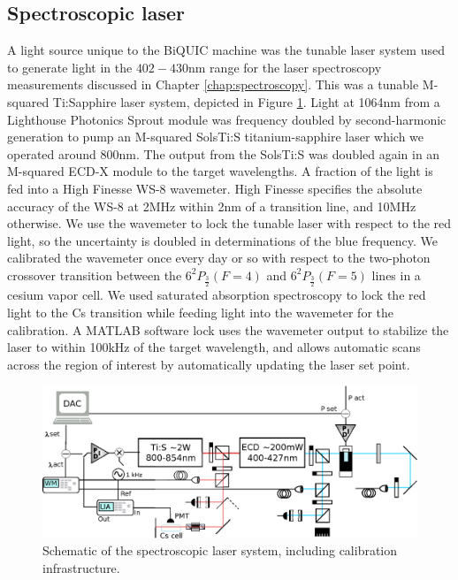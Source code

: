 \subsection*{Spectroscopic laser}
	A light source unique to the BiQUIC machine was the tunable laser system used to generate light in the $402-430$nm range for the laser spectroscopy measurements discussed  in Chapter \ref{chap:spectroscopy}. This  was a tunable M-squared Ti:Sapphire laser system, depicted in Figure \ref{fig:tunable_laser}. Light at 1064nm from a Lighthouse Photonics Sprout module was frequency doubled by second-harmonic generation to pump an M-squared SolsTi:S titanium-sapphire laser which we operated around 800nm. The output from the SolsTi:S was doubled again in an M-squared ECD-X module to the target wavelengths. A fraction of the light is fed into a High Finesse WS-8 wavemeter. High Finesse specifies the absolute accuracy of the WS-8 at 2MHz within 2nm of a transition line, and 10MHz otherwise. We use the wavemeter to lock the tunable laser with respect to the red light, so the uncertainty is doubled in determinations of the blue frequency. We calibrated the wavemeter once every day or so with respect to the two-photon crossover transition between the $6^2P_{\frac{3}{2}} (F=4)$ and $6^2P_{\frac{3}{2}} (F=5)$ lines in a cesium vapor cell. We used saturated absorption spectroscopy to lock the red light to the Cs transition while feeding light into the wavemeter for the calibration.	A MATLAB software lock uses the wavemeter output to stabilize the laser to within 100kHz of the target wavelength, and allows automatic scans across the region of interest by automatically updating the laser set point. 

	\begin{figure}
		\centering
		\includegraphics[width=\textwidth]{fig/apparatus/solstis_schematic_minim}
		\caption{Schematic of the spectroscopic laser system, including calibration infrastructure. }
		\label{fig:tunable_laser}
	\end{figure}
	
